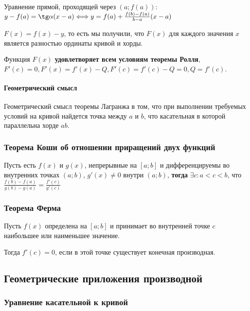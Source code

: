 \documentclass{article}
\begin{document}
\begin{flushleft}
Уравнение прямой, проходящей через $(a; f(a))$: $y - f(a) = \tg \alpha (x - a) \Longleftrightarrow y = f(a) + \frac{f(b) - f(a)}{b - a}(x - a)$

$F(x) = f(x) - y$, то есть мы получили, что $F(x)$ для каждого значения $x$ является разностью ординаты кривой и хорды.

\hfill

Функция $F(x)$ \textbf{удовлетворяет всем условиям теоремы Ролля}, $F'(c) = 0, F'(x) = f'(x) - Q, F'(c) = f'(c) - Q = 0, Q = f'(c)$.

\paragraph{Геометрический смысл} Геометрический смысл теоремы Лагранжа в том, что при выполнении требуемых условий на кривой найдется точка между $a$ и $b$, что касательная в которой параллельна хорде $ab$.

\subsubsection{Теорема Коши об отношении приращений двух функций}

Пусть есть $f(x)$ и $g(x)$, непрерывные на $[ a; b ]$ и дифференцируемы во внутренних точках $(a; b)$, $g'(x) \ne 0$ внутри $(a; b)$, \textbf{тогда} $\exists c: a < c < b$, что $\frac{f(b) - f(a)}{g(b) - g(a)} = \frac{f'(c)}{g'(c)}$

\subsubsection{Теорема Ферма}

Пусть $f(x)$ определена на $[a; b]$ и принимает во внутренней точке $c$ наибольшее или наименьшее значение.

Тогда $f'(c) = 0$, если в этой точке существует конечная производная.

\end{flushleft}

\subsection{Геометрические приложения производной}

\subsubsection{Уравнение касательной к кривой}
\end{document}
